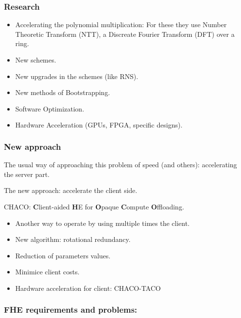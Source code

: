 \documentclass[10pt,handout]{beamer}
\begin{document}
\begin{frame}
\frametitle{Research}

\begin{itemize}
   \item Accelerating the polynomial multiplication:
    For these they use Number Theoretic Transform (NTT), a Discreate Fourier Transform (DFT) over a ring.
    \item New schemes.
    \item New upgrades in the schemes (like RNS).
   \item New methods of Bootstrapping.
   \item Software Optimization.
   \item Hardware Acceleration (GPUs, FPGA, specific designs).
\end{itemize}

\end{frame}


\begin{frame}
\frametitle{New approach}

    The usual way of approaching this problem of speed (and others):  accelerating the server
    part.

    The new approach:  accelerate the client side.

    CHACO: \textbf{C}lient-aided \textbf{H}E for \textbf{O}paque \textbf{C}ompute \textbf{O}ffloading.


    \begin{itemize}
        \item Another way to operate by using multiple times the client.
        \item New algorithm: rotational redundancy.
        \item Reduction of parameters values.
        \item Minimice client costs.
        \item Hardware acceleration for client: CHACO-TACO
    \end{itemize}


\end{frame}


\begin{frame}
\frametitle{FHE requirements and problems:}


\end{frame}
\end{document}
